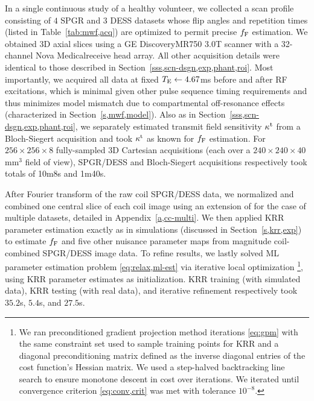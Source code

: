 In a single continuous study
of a healthy volunteer,
we collected a scan profile 
consisting of $4$ SPGR and $3$ DESS datasets
whose flip angles and repetition times
(listed in Table~\ref{tab:mwf,acq}) 
are optimized 
to permit precise $f_{\mathrm{F}}$ estimation. 
We obtained 3D axial slices 
using a GE Discovery\tmark MR750 3.0T scanner
with a 32-channel Nova Medical\regis receive head array.
All other acquisition details were identical
to those described in Section~\ref{sss,scn-dsgn,exp,phant,roi}.
Most importantly,
we acquired all data 
at fixed $T_\mathrm{E} \gets 4.67$ms
before and after RF excitations,
which is minimal
given other pulse sequence timing requirements
and thus minimizes model mismatch 
due to compartmental off-resonance effects
(characterized in Section~\ref{s,mwf,model}).
Also as in Section~\ref{sss,scn-dsgn,exp,phant,roi},
we separately estimated
transmit field sensitivity $\kappa^{\mathrm{t}}$
from a Bloch-Siegert acquisition \cite{sacolick:10:bmb}
and took $\kappa^{\mathrm{t}}$ as known
for $f_{\mathrm{F}}$ estimation.
For $256\times256\times8$ fully-sampled 3D Cartesian acquisitions
(each over a $240\times240\times40$mm$^3$ field of view),
SPGR/DESS and Bloch-Siegert acquisitions respectively took totals
of 10m8s and 1m40s. 

After Fourier transform of the raw coil SPGR/DESS data,
we normalized and combined 
one central slice 
of each coil image
using an extension of \cite{ying:07:jir}
for the case of multiple datasets,
detailed in Appendix~\ref{a,cc-multi}.
We then applied KRR parameter estimation
exactly as in simulations
(discussed in Section~\ref{s,krr,exp})
to estimate $f_{\mathrm{F}}$ and five other nuisance parameter maps
from magnitude coil-combined SPGR/DESS image data.
To refine results,
we lastly solved ML parameter estimation problem
\eqref{eq:relax,ml-est}
via iterative local optimization
\footnote{We ran preconditioned gradient projection method iterations 
	\eqref{eq:gpm}
	with the same constraint set 
	used to sample training points 
	for KRR 
	and a diagonal preconditioning matrix
	defined as the inverse diagonal entries
	of the cost function's Hessian matrix.
	We used a step-halved backtracking line search 
	to ensure monotone descent
	in cost over iterations.
	We iterated until convergence criterion \eqref{eq:conv,crit}
	was met with tolerance $10^{-8}$. 
},
using KRR parameter estimates as initialization.
KRR training (with simulated data),
KRR testing (with real data),
and iterative refinement 
respectively took $35.2$s, $5.4$s, and $27.5$s.

